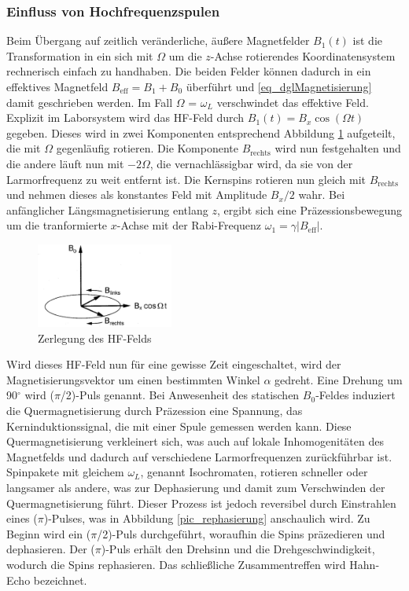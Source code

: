 \subsubsection{Einfluss von Hochfrequenzspulen}
\label{sec_hochfrequenz}
Beim Übergang auf zeitlich veränderliche, äußere Magnetfelder $B_1(t)$ ist die Transformation in ein sich mit $\Omega$ um die $z$-Achse rotierendes 
Koordinatensystem rechnerisch einfach zu handhaben. Die beiden Felder können dadurch in ein effektives Magnetfeld $B_\text{eff} = B_1 + B_0$ überführt
und \eqref{eq_dglMagnetisierung} damit geschrieben werden. Im Fall $\Omega$ = $\omega_L$ verschwindet das effektive Feld. Explizit im Laborsystem wird
das HF-Feld durch $B_1(t) = B_x \cos(\Omega t)$ gegeben. Dieses wird in zwei Komponenten entsprechend Abbildung \ref{pic_rotSystem} aufgeteilt, die mit
$\Omega$ gegenläufig rotieren. Die Komponente $B_\text{rechts}$ wird nun festgehalten und die andere läuft nun mit $-2\Omega$, die vernachlässigbar wird,
da sie von der Larmorfrequenz zu weit entfernt ist. Die Kernspins rotieren nun gleich mit $B_\text{rechts}$ und nehmen dieses als konstantes Feld mit 
Amplitude $B_x /2$ wahr. Bei anfänglicher Längsmagnetisierung entlang $z$, ergibt sich eine Präzessionsbewegung um die tranformierte $x$-Achse mit der
Rabi-Frequenz $\omega_1 = \gamma |B_\text{eff}|$.
\begin{figure}[H]
 \includegraphics[width=0.4\textwidth]{../pics/rotSystem.jpg}
 \caption{Zerlegung des HF-Felds}
 \label{pic_rotSystem}
\end{figure}
\noindent
Wird dieses HF-Feld nun für eine gewisse Zeit eingeschaltet, wird der Magnetisierungsvektor um einen bestimmten Winkel $\alpha$ gedreht. Eine Drehung um
90$^\circ$ wird ($\pi$/2)-Puls genannt. Bei Anwesenheit des statischen $B_0$-Feldes induziert die Quermagnetisierung durch Präzession eine Spannung, das
Kerninduktionssignal, die mit einer Spule gemessen werden kann. Diese Quermagnetisierung verkleinert sich, was auch auf lokale Inhomogenitäten des 
Magnetfelds und dadurch auf verschiedene Larmorfrequenzen zurückführbar ist. Spinpakete mit gleichem $\omega_L$, genannt Isochromaten, rotieren schneller
oder langsamer als andere, was zur Dephasierung und damit zum Verschwinden der Quermagnetisierung führt. Dieser Prozess ist jedoch reversibel durch 
Einstrahlen eines ($\pi$)-Pulses, was in Abbildung \ref{pic_rephasierung} anschaulich wird. Zu Beginn wird ein ($\pi$/2)-Puls durchgeführt, woraufhin die
Spins präzedieren und dephasieren. Der ($\pi$)-Puls erhält den Drehsinn und die Drehgeschwindigkeit, wodurch die Spins rephasieren. Das schließliche 
Zusammentreffen wird Hahn-Echo bezeichnet.

